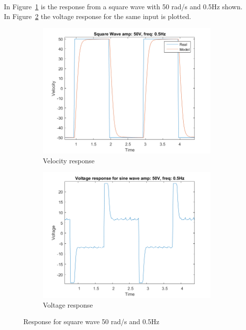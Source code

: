 \documentclass[12pt,a4paper]{article}
\begin{document}
In Figure~\ref{fig:T2_a50_f05:a} is the response from a square wave with
50 rad/s and 0.5Hz shown. In Figure~\ref{fig:T2_a50_f05:b} the voltage
response for the same input is plotted.
\begin{figure}[H]
  \centering
  \begin{subfigure}[b]{0.45\linewidth}
    \includegraphics[width=\linewidth]{T2_a50_f05.png}
    \caption{Velocity response }
    \label{fig:T2_a50_f05:a}
  \end{subfigure}
  \begin{subfigure}[b]{0.45\linewidth}
    \includegraphics[width=\linewidth]{T2_V_a50_f05.png}
    \caption{Voltage response }
    \label{fig:T2_a50_f05:b}
  \end{subfigure}
  \caption{Response for square wave 50 rad/s and 0.5Hz}
  \label{fig:T2_a50_f05}
\end{figure}
\end{document}
